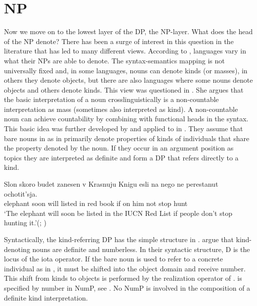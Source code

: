 \documentclass[output=paper]{langscibook}
\begin{document}
\section{NP}

Now we move on to the lowest layer of the DP, the NP-layer. What does the head of the NP denote? There has been a surge of interest in this question in the literature that has led to many different views. According to \citet{Chierchia1998}, languages vary in what their NPs are able to denote. The syntax-semantics mapping is not universally fixed and, in some languages, nouns can denote kinds (or masses), in others they denote objects, but there are also languages where some nouns denote objects and others denote kinds. This view was questioned in \citet{Borer2005}. She argues that the basic interpretation of a noun crosslinguistically is a non-countable interpretation as mass (sometimes also interpreted as kind). A non-countable noun can achieve countability by combining with functional heads in the syntax. This basic idea was further developed by \citet{Borik.Espinal2012, Borik.Espinal2015} and applied to  in \citet{Borik.Espinal2012}. They assume that bare nouns in  as in  primarily denote properties of kinds of individuals that share the property denoted by the noun. If they occur in an argument position as topics they are interpreted as definite and form a DP that refers directly to a kind.

\ea \label{ex:20}
\gll Slon skoro budet zanesen v Krasnuju Knigu esli na nego ne perestanut ochotit'sja.\\
   elephant soon will listed in red book if on him not stop hunt\\
\glt `The elephant will soon be listed in the IUCN Red List if people don’t stop hunting it.'\hfill (; \citealt[137]{Borik.Espinal2012})
\z

\noindent Syntactically, the kind-referring DP has the simple structure in . \citeauthor{Borik.Espinal2012} argue that kind-denoting nouns are definite and numberless. In their syntactic structure, D is the locus of the iota operator. If the bare noun is used to refer to a concrete individual as in , it must be shifted into the object domain and receive number. This shift from kinds to objects is performed by the realization operator  of \citet{Carlson1977}.  is specified by number in NumP, see . No NumP is involved in the composition of a definite kind interpretation.
\end{document}
